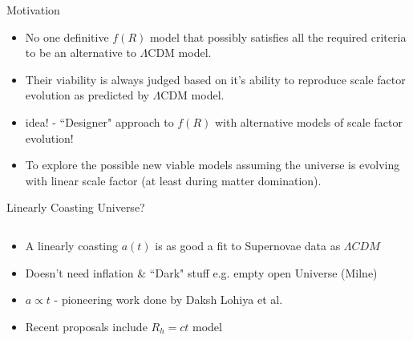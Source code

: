 \documentclass[final,hyperref={pdfpagelabels=false}]{beamer}
\begin{document}
\begin{frame}[t]
\begin{columns}[t]
\begin{column}{.465\textwidth}
\begin{block}{Motivation}
\begin{itemize}
\item No one definitive $f(R)$ model that possibly satisfies all the required criteria to be an alternative to $\Lambda$CDM model.
\item Their viability is always judged based on it's ability to reproduce scale factor evolution as predicted by $\Lambda$CDM model.
\item idea! - ``Designer" approach to $f(R)$ with alternative models of scale factor evolution!
\item To explore the possible new viable models assuming the universe is evolving with linear scale factor (at least during matter domination).
\end{itemize}

\end{block}


\begin{block}{Linearly Coasting Universe?}

\begin{columns} %
\begin{column}{.40\textwidth} %
\begin{itemize}
	\item A linearly coasting $a(t)$ is as good a fit to Supernovae data as $\Lambda CDM$\cite{nielsen2015marginal}
	\item Doesn't need inflation \& ``Dark" stuff e.g. empty open Universe (Milne)
	\item $a\propto t$ - pioneering work done by Daksh Lohiya et al.\cite{gehlaut2002freely}
	\item Recent proposals include $R_h=ct$ model\cite{melia2012rh}
\end{itemize}
\end{column}


\end{columns}
\end{block}
\end{column}
\end{columns}
\end{frame}
\end{document}
